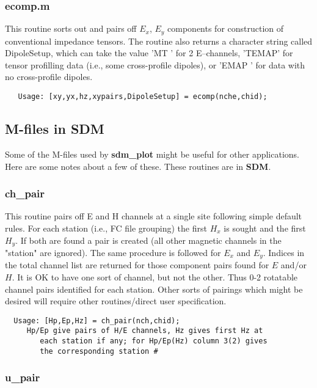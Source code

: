 \subsubsection{ecomp.m}
This routine sorts out and pairs off $E_x$, $E_y$ components for construction
of conventional impedance tensors.  The routine also returns a character string
called DipoleSetup, which can take the value 'MT   ' for 2 E--channels,
'TEMAP' for tensor profilling data (i.e., some cross-profile
dipoles), or 'EMAP ' for data with no cross-profile dipoles.

\small
\begin{verbatim}
   Usage: [xy,yx,hz,xypairs,DipoleSetup] = ecomp(nche,chid);
\end{verbatim}
\normalsize

\subsection{M-files in SDM}

Some of the M-files used by {\bf sdm\_plot} might be useful
for other applications.  Here are some notes about a few of these.
These routines are in {\bf SDM}.

\subsubsection{ch\_pair}

This routine pairs off E and H channels at a single site
following simple default rules.
For each station (i.e., FC file grouping)
the first $H_x$ is sought and the first $H_y$.  If both are
found a pair is created (all other magnetic channels in the "station"
are ignored).  The same procedure is followed for
$E_x$ and $E_y$.  Indices in the total
channel list are returned for those component pairs found for
$E$ and/or $H$.  It is OK to have one sort of channel, but not
the other.  Thus
0-2 rotatable channel pairs identified for each station.
Other sorts of pairings which might be desired will require
other routines/direct user specification.

\small
\begin{verbatim}
  Usage: [Hp,Ep,Hz] = ch_pair(nch,chid);
     Hp/Ep give pairs of H/E channels, Hz gives first Hz at
        each station if any; for Hp/Ep(Hz) column 3(2) gives
        the corresponding station #
\end{verbatim}
\normalsize

\subsubsection{u\_pair}

